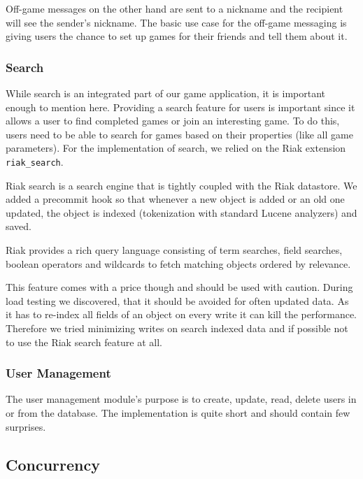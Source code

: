 \documentclass[11pt,a4paper]{report}
\begin{document}
Off-game messages on the other hand are sent to a nickname and the recipient
will see the sender's nickname. The basic use case for the off-game messaging
is giving users the chance to set up games for their friends and tell them
about it.
\subsubsection{Search}
While search is an integrated part of our game application, it is important
enough to mention here. Providing a search feature for users is important since
it allows a user to find completed games or join an interesting game. To do
this, users need to be able to search for games based on their properties (like
all game parameters). For the implementation of search, we relied on the Riak
extension {\tt riak\_search}.

Riak search is a search engine that is tightly coupled with the Riak datastore.
We added a precommit hook so that whenever a new object is added or an old one
updated, the object is indexed (tokenization with standard Lucene analyzers)
and saved.

Riak provides a rich query language consisting of term searches, field searches,
boolean operators and wildcards to fetch matching objects ordered by relevance.

This feature comes with a price though and should be used with caution.
During load testing we discovered, that it should be avoided for often updated
data.
As it has to re-index all fields of an object on every write it can kill the
performance.
Therefore we tried minimizing writes on search indexed data and if possible not
to use the Riak search feature at all.

\subsubsection{User Management}
The user management module's purpose is to create, update, read, delete users
in or from the database. The implementation is quite short and should contain
few surprises.

\subsection{Concurrency}
\label{sec:concurrency}
\end{document}
